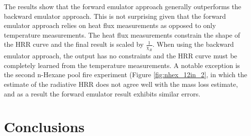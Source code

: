 \documentclass{article}
\begin{document}
The results show that the forward emulator approach generally outperforms the backward emulator approach. This is not surprising given that the forward emulator approach relies on heat flux measurements as opposed to only temperature measurements. The heat flux measurements constrain the shape of the HRR curve and the final result is scaled by $\frac{1}{\chi_R}$. When using the backward emulator approach, the output has no constraints and the HRR curve must be completely learned from the temperature measurements. A notable exception is the second n-Hexane pool fire experiment (Figure \ref{fig:nhex_12in_2}, in which the estimate of the radiative HRR does not agree well with the mass loss estimate, and as a result the forward emulator result exhibits similar errors.  

\section{Conclusions}
\end{document}

